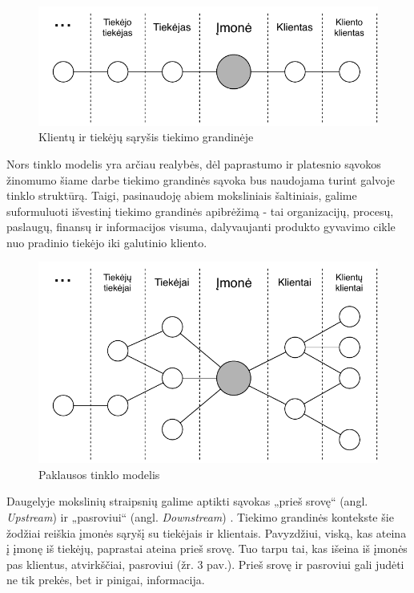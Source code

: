 \begin{figure}[H]
    \centering
    \includegraphics[scale=1]{images/client-supplier-model}
    \caption{Klientų ir tiekėjų sąryšis tiekimo grandinėje}
\end{figure}

Nors tinklo modelis yra arčiau realybės, dėl paprastumo ir platesnio sąvokos žinomumo šiame darbe tiekimo grandinės sąvoka bus naudojama turint galvoje tinklo struktūrą. Taigi, pasinaudoję abiem moksliniais šaltiniais, galime suformuluoti išvestinį tiekimo grandinės apibrėžimą - tai organizacijų, procesų, paslaugų, finansų ir informacijos visuma, dalyvaujanti produkto gyvavimo cikle nuo pradinio tiekėjo iki galutinio kliento.

\begin{figure}[H]
    \centering
    \includegraphics[scale=0.8]{images/demand-network-model}
    \caption{Paklausos tinklo modelis}
\end{figure}

Daugelyje mokslinių straipsnių galime aptikti sąvokas „prieš srovę“ (angl. \textit{Upstream}) ir „pasroviui“ (angl. \textit{Downstream}) \cite{croson2005upstream} \cite{frohlich2001arcs} \cite{vachon2006extending}. Tiekimo grandinės kontekste šie žodžiai reiškia įmonės sąryšį su tiekėjais ir klientais. Pavyzdžiui, viską, kas ateina į įmonę iš tiekėjų, paprastai ateina prieš srovę. Tuo tarpu tai, kas išeina iš įmonės pas klientus, atvirkščiai, pasroviui \cite{christopher2016logistics} (žr. 3 pav.). Prieš srovę ir pasroviui gali judėti ne tik prekės, bet ir pinigai, informacija.

